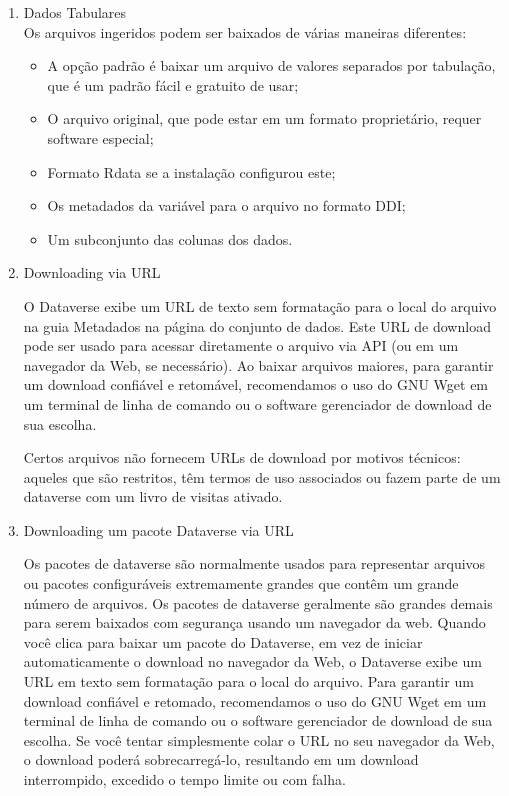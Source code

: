 \documentclass[12pt,hidelinks]{article}
\begin{document}
    	    \begin{enumerate}[a]
	            \item Dados Tabulares\\
	            
\qquad Os arquivos ingeridos podem ser baixados de várias maneiras diferentes:

\begin{itemize}
\item A opção padrão é baixar um arquivo de valores separados por tabulação, que é um padrão fácil e gratuito de usar;
\item O arquivo original, que pode estar em um formato proprietário, requer software especial;
\item Formato Rdata se a instalação configurou este;
\item Os metadados da variável para o arquivo no formato DDI;
\item Um subconjunto das colunas dos dados.
\end{itemize}
	            
	            \item Downloading via URL
	           
\qquad O Dataverse exibe um URL de texto sem formatação para o local do arquivo na guia Metadados na página do conjunto de dados. Este URL de download pode ser usado para acessar diretamente o arquivo via API (ou em um navegador da Web, se necessário). Ao baixar arquivos maiores, para garantir um download confiável e retomável, recomendamos o uso do GNU Wget em um terminal de linha de comando ou o software gerenciador de download de sua escolha.

\qquad Certos arquivos não fornecem URLs de download por motivos técnicos: aqueles que são restritos, têm termos de uso associados ou fazem parte de um dataverse com um livro de visitas ativado.
	            
	            \item Downloading um pacote Dataverse via URL
	            
\qquad Os pacotes de dataverse são normalmente usados para representar arquivos ou pacotes configuráveis extremamente grandes que contêm um grande número de arquivos. Os pacotes de dataverse geralmente são grandes demais para serem baixados com segurança usando um navegador da web. Quando você clica para baixar um pacote do Dataverse, em vez de iniciar automaticamente o download no navegador da Web, o Dataverse exibe um URL em texto sem formatação para o local do arquivo. Para garantir um download confiável e retomado, recomendamos o uso do GNU Wget em um terminal de linha de comando ou o software gerenciador de download de sua escolha. Se você tentar simplesmente colar o URL no seu navegador da Web, o download poderá sobrecarregá-lo, resultando em um download interrompido, excedido o tempo limite ou com falha.
	            
	        \end{enumerate}
\end{document}
